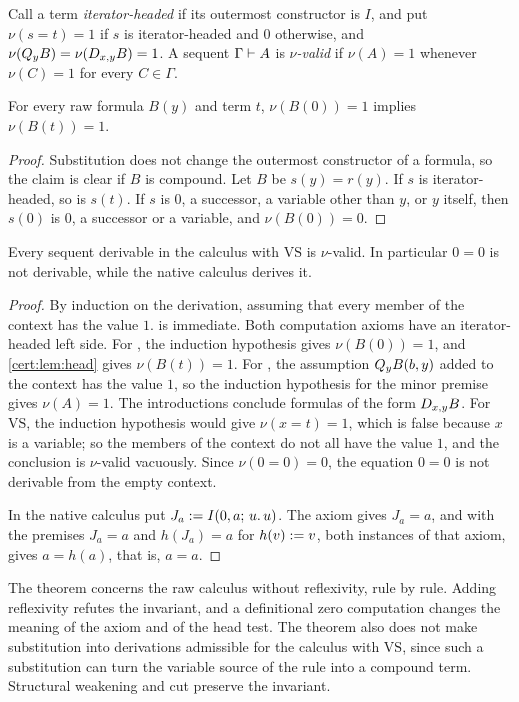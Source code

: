 Call a term \emph{iterator-headed} if its outermost constructor is $I$, and
put $\nu(s=t)=1$ if $s$ is iterator-headed and $0$ otherwise, and
$\nu(Q_{y}B)=\nu(D_{x,y}B)=1$. A sequent $\Gamma\vdash A$ is
\emph{$\nu$-valid} if $\nu(A)=1$ whenever $\nu(C)=1$ for every $C\in\Gamma$.

\begin{lemma}\label{cert:lem:head}
For every raw formula $B(y)$ and term $t$, $\nu(B(0))=1$ implies $\nu(B(t))=1$.
\end{lemma}
\begin{proof}
Substitution does not change the outermost constructor of a formula, so the
claim is clear if $B$ is compound. Let $B$ be $s(y)=r(y)$. If $s$ is
iterator-headed, so is $s(t)$. If $s$ is $0$, a successor, a variable other
than $y$, or $y$ itself, then $s(0)$ is $0$, a successor or a variable, and
$\nu(B(0))=0$.
\end{proof}

\begin{theorem}\label{cert:thm:vs}
Every sequent derivable in the calculus with $\mathrm{VS}$ is $\nu$-valid. In
particular $0=0$ is not derivable, while the native calculus derives it.
\end{theorem}
\begin{proof}
By induction on the derivation, assuming that every member of the context has
the value $1$.  is immediate. Both computation axioms have an
iterator-headed left side. For , the induction hypothesis gives
$\nu(B(0))=1$, and \cref{cert:lem:head} gives $\nu(B(t))=1$. For ,
the assumption $Q_{y}B(b,y)$ added to the context has the value $1$, so the
induction hypothesis for the minor premise gives $\nu(A)=1$. The
introductions conclude formulas of the form $D_{x,y}B$. For $\mathrm{VS}$,
the induction hypothesis would give $\nu(x=t)=1$, which is false because $x$
is a variable; so the members of the context do not all have the value $1$,
and the conclusion is $\nu$-valid vacuously. Since $\nu(0=0)=0$, the
equation $0=0$ is not derivable from the empty context.

In the native calculus put $J_a\mathrel{:=}I(0,a;\,u.\,u)$. The axiom gives
$J_a=a$, and  with the premises $J_a=a$ and $h(J_a)=a$ for
$h(v)\mathrel{:=} v$, both instances of that axiom, gives $a=h(a)$, that is, $a=a$.
\end{proof}

The theorem concerns the raw calculus without reflexivity, rule by rule.
Adding reflexivity refutes the invariant, and a definitional zero computation
changes the meaning of the axiom and of the head test. The theorem also does
not make substitution into derivations admissible for the calculus with
$\mathrm{VS}$, since such a substitution can turn the variable source of the
rule into a compound term. Structural weakening and cut preserve the
invariant.

